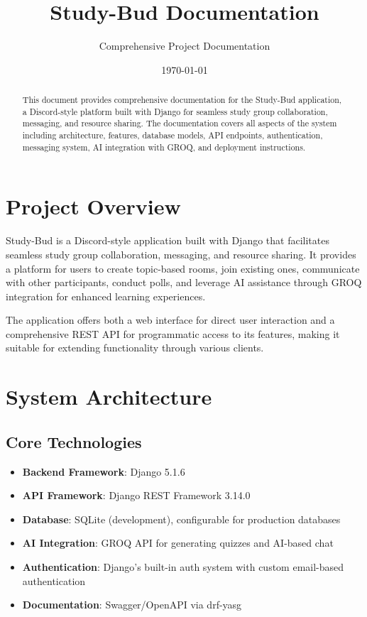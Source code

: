 \documentclass[11pt]{article}
\title{\textbf{\LARGE{Study-Bud Documentation}}}
\author{Comprehensive Project Documentation}
\date{\today}
\begin{document}
\maketitle
\thispagestyle{empty}

\begin{abstract}
This document provides comprehensive documentation for the Study-Bud application, a Discord-style platform built with Django for seamless study group collaboration, messaging, and resource sharing. The documentation covers all aspects of the system including architecture, features, database models, API endpoints, authentication, messaging system, AI integration with GROQ, and deployment instructions.
\end{abstract}

\newpage
\tableofcontents
\newpage

\section{Project Overview}

Study-Bud is a Discord-style application built with Django that facilitates seamless study group collaboration, messaging, and resource sharing. It provides a platform for users to create topic-based rooms, join existing ones, communicate with other participants, conduct polls, and leverage AI assistance through GROQ integration for enhanced learning experiences.

The application offers both a web interface for direct user interaction and a comprehensive REST API for programmatic access to its features, making it suitable for extending functionality through various clients.

\section{System Architecture}

\subsection{Core Technologies}
\begin{itemize}
  \item \textbf{Backend Framework}: Django 5.1.6
  \item \textbf{API Framework}: Django REST Framework 3.14.0
  \item \textbf{Database}: SQLite (development), configurable for production databases
  \item \textbf{AI Integration}: GROQ API for generating quizzes and AI-based chat
  \item \textbf{Authentication}: Django's built-in auth system with custom email-based authentication
  \item \textbf{Documentation}: Swagger/OpenAPI via drf-yasg
\end{itemize}
\end{document}
